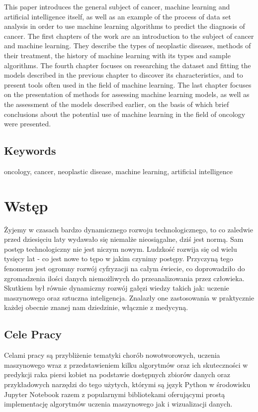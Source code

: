 \documentclass[a4paper,12pt,oneside]{book}
\begin{document}
This paper introduces the general subject of cancer, machine learning and artificial intelligence itself, as well as an example of the process of data set analysis in order to use machine learning algorithms to predict the diagnosis of cancer.\newline
The first chapters of the work are an introduction to the subject of cancer and machine learning. They describe the types of neoplastic diseases, methods of their treatment, the history of machine learning with its types and sample algorithms.\newline
The fourth chapter focuses on researching the dataset and fitting the models described in the previous chapter to discover its characteristics, and to present tools often used in the field of machine learning.\newline
The last chapter focuses on the presentation of methods for assessing machine learning models, as well as the assessment of the models described earlier, on the basis of which brief conclusions about the potential use of machine learning in the field of oncology were presented.

\section*{Keywords}
oncology, cancer, neoplastic disease,  machine learning, artificial intelligence


\thispagestyle{empty}
\newpage{}

\tableofcontents{}

\chapter{Wstęp}
\label{Wstep}
Żyjemy w czasach bardzo dynamicznego rozwoju technologicznego, to co zaledwie przed dziesięciu laty wydawało się niemalże nieosiągalne, dziś jest normą. Sam postęp technologiczny nie jest niczym nowym. Ludzkość rozwija się od wielu tysięcy lat - co jest nowe to tępo w jakim czynimy postępy. Przyczyną tego fenomenu jest ogromny rozwój cyfryzacji na całym świecie, co doprowadziło do zgromadzenia ilości danych niemożliwych do przeanalizowania przez człowieka. Skutkiem był równie dynamiczny rozwój gałęzi wiedzy takich jak: uczenie maszynowego oraz sztuczna inteligencja. Znalazły one zastosowania w praktycznie każdej obecnie znanej nam dziedzinie, włącznie z medycyną.

\section{Cele Pracy}
Celami pracy są przybliżenie tematyki chorób nowotworowych, uczenia  maszynowego wraz z przedstawieniem kilku algorytmów oraz ich skuteczności w predykcji raka piersi kobiet na podstawie dostępnych zbiorów danych oraz przykładowych narzędzi do tego użytych, którymi są język Python w środowisku Jupyter Notebook razem z popularnymi bibliotekami oferującymi prostą implementację algorytmów uczenia  maszynowego jak i wizualizacji danych.
\end{document}
